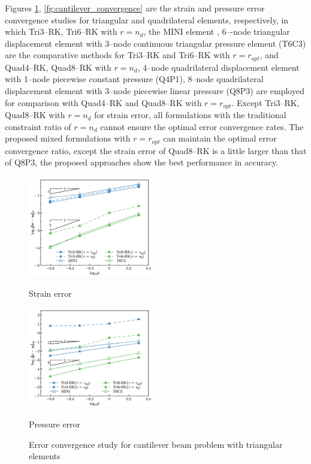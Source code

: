Figures \ref{fg:cantilever_convergence_tri}, \ref{fg:cantilever_convergence} are the strain and pressure error convergence studies for triangular and quadrilateral elements, respectively,
in which Tri3--RK, Tri6--RK with $r=n_d$, the MINI element \cite{auricchio2005}, 6–-node triangular displacement element with 3–node continuous triangular pressure element (T6C3) are the comparative methods for Tri3--RK and Tri6--RK with $r=r_{opt}$,
and Quad4--RK, Quad8--RK with $r=n_d$, 4--node quadrilateral displacement element with 1--node piecewise constant pressure (Q4P1), 8--node quadrilateral displacement element with 3--node piecewise linear pressure (Q8P3) are employed for comparison with Quad4--RK and Quad8--RK with $r=r_{opt}$.
Except Tri3--RK, Quad8--RK with $r=n_d$ for strain error, all formulations with the traditional constraint ratio of $r=n_d$ cannot ensure the optimal error convergence rates. The proposed mixed formulations with $r=r_{opt}$ can maintain the optimal error convergence ratio, except the strain error of Quad8--RK is a little larger than that of Q8P3, the proposed approaches show the best performance in accuracy.

\begin{figure}[H]
\centering
\begin{subcaptiongroup}
\centering
\parbox[b]{0.49\textwidth}{
    \includegraphics[width=0.49\textwidth]{cantilever_tri_Hdev.png}
    \caption{Strain error}\label{fg:cantilever_convergence_strain_tri}
}
\parbox[b]{0.49\textwidth}{
    \includegraphics[width=0.49\textwidth]{cantilever_tri_L2_p.png}
    \caption{Pressure error}\label{fg:cantilever_convergence_pressure_tri}
}
\end{subcaptiongroup}
\caption{Error convergence study for cantilever beam problem with triangular elements}\label{fg:cantilever_convergence_tri}
\end{figure}

